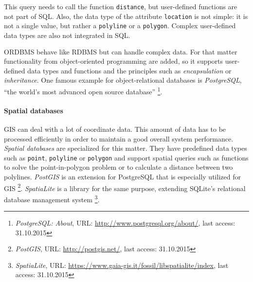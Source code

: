 This query needs to call the function \texttt{distance}, but user-defined functions are not part of SQL. Also, the data type of the attribute \texttt{location} is not simple: it is not a single value, but rather a \texttt{polyline} or a \texttt{polygon}. Complex user-defined data types are also not integrated in SQL.

ORDBMS behave like RDBMS but can handle complex data. For that matter functionality from object-oriented programming are added, so it supports user-defined data types and functions and the principles such as \emph{encapsulation} or \emph{inheritance}.
One famous example for object-relational databases is \emph{PostgreSQL}, ``the world's most advanced open source database''
\footnote{
  \textit{PostgreSQL: About},
  URL: \url{http://www.postgresql.org/about/},
  last access: 31.10.2015
}.

\paragraph{Spatial databases} %
\label{par:spatial_databases}
GIS can deal with a lot of coordinate data. This amount of data has to be processed efficiently in order to maintain a good overall system performance. \emph{Spatial databases} are specialized for this matter. They have predefined data types such as \texttt{point}, \texttt{polyline} or \texttt{polygon} and support spatial queries such as functions to solve the point-in-polygon problem or to calculate a distance between two polylines. \emph{PostGIS} is an extension for PostgreSQL that is especially utilized for GIS
\footnote{
  \textit{PostGIS},
  URL: \url{http://postgis.net/},
  last access: 31.10.2015
}.
\emph{SpatiaLite} is a library for the same purpose, extending SQLite's relational database management system
\footnote{
  \textit{SpatiaLite},
  URL: \url{https://www.gaia-gis.it/fossil/libspatialite/index},
  last access: 31.10.2015
}.




